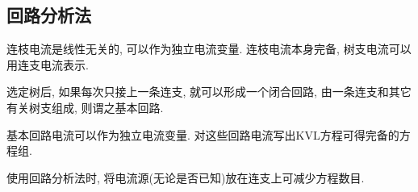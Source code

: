 \documentclass{ctexart}
\begin{document}

\subsection{回路分析法} %
\label{sub:回路分析法}

连枝电流是线性无关的, 可以作为独立电流变量. 连枝电流本身完备, 树支电流可以用连支电流表示. 
\par
选定树后, 如果每次只接上一条连支, 就可以形成一个闭合回路, 由一条连支和其它有关树支组成, 则谓之基本回路.
\par
基本回路电流可以作为独立电流变量. 对这些回路电流写出KVL方程可得完备的方程组. 
\par
使用回路分析法时, 将电流源(无论是否已知)放在连支上可减少方程数目.


\end{document}
